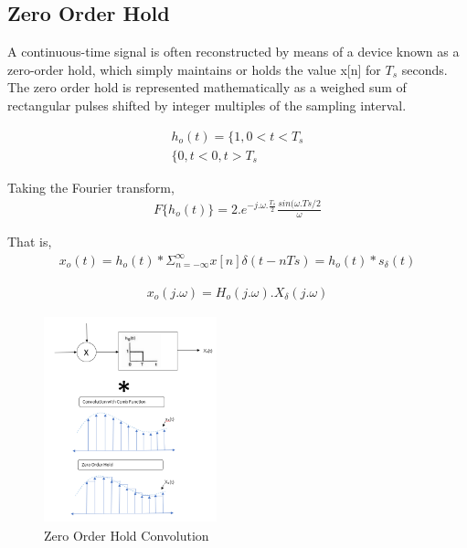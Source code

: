 \documentclass{article}
\begin{document}
\subsection{Zero Order Hold}
A continuous-time signal is often reconstructed by means of a device known as a zero-order hold, which simply maintains or holds the value x[n] for $ T_s $ seconds. The zero order hold is represented mathematically as a weighed sum of rectangular pulses shifted by integer multiples of the sampling interval. 

\begin{equation}
\begin{aligned}
    h_o(t) = \Big\{ 1, 0<t<T_s \\
             \Big\{ 0, t < 0, t > T_s
\end{aligned}
\end{equation}

Taking the Fourier transform, 
\begin{equation}
\begin{aligned}
    F \{ h_o(t) \} = 2.e^{-j.\omega.\frac{T_s}{2}} \frac{sin(\omega.Ts/2}{\omega} 
\end{aligned}
\end{equation}

That is, 
\begin{equation}
\begin{aligned}
    x_o(t) = h_o(t) * \Sigma_{n = -\infty}^{\infty} x[n]\delta(t-nTs) = h_o(t) * s_\delta (t)
\end{aligned}
\end{equation}

\begin{equation}
\begin{aligned}
    x_o(j.\omega) = H_o(j.\omega). X_\delta(j.\omega) 
\end{aligned}
\end{equation}

\begin{figure}[htbp]
    \begin{center}
	\includegraphics[width=5cm, height=6cm]{figures/ZOH.PNG}
    \end{center}
    \caption{Zero Order Hold Convolution}
\end{figure}
\end{document}
